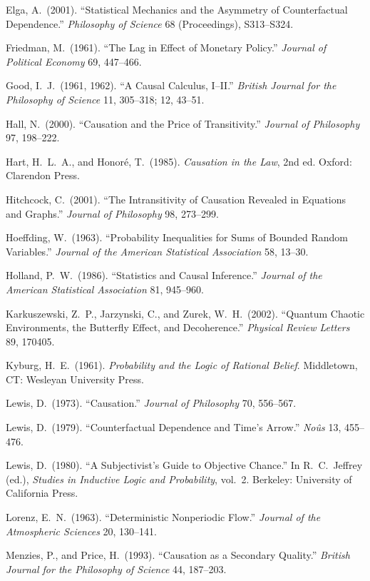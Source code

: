 \documentclass[11pt]{article}
\theoremstyle{definition}
\newenvironment{refs}{%
  \begin{list}{}{%
    \setlength{\leftmargin}{1.6em}%
    \setlength{\itemindent}{-1.6em}%
    \setlength{\itemsep}{0.35em}%
    \setlength{\parsep}{0pt}%
  }}
  {\end{list}}
\begin{document}
\begin{refs}
\item Elga, A.\ (2001). ``Statistical Mechanics and the Asymmetry of Counterfactual Dependence.'' \emph{Philosophy of Science} 68 (Proceedings), S313--S324.
\item Friedman, M.\ (1961). ``The Lag in Effect of Monetary Policy.'' \emph{Journal of Political Economy} 69, 447--466.
\item Good, I.\ J.\ (1961, 1962). ``A Causal Calculus, I--II.'' \emph{British Journal for the Philosophy of Science} 11, 305--318; 12, 43--51.
\item Hall, N.\ (2000). ``Causation and the Price of Transitivity.'' \emph{Journal of Philosophy} 97, 198--222.
\item Hart, H.\ L.\ A., and Honor\'e, T.\ (1985). \emph{Causation in the Law}, 2nd ed. Oxford: Clarendon Press.
\item Hitchcock, C.\ (2001). ``The Intransitivity of Causation Revealed in Equations and Graphs.'' \emph{Journal of Philosophy} 98, 273--299.
\item Hoeffding, W.\ (1963). ``Probability Inequalities for Sums of Bounded Random Variables.'' \emph{Journal of the American Statistical Association} 58, 13--30.
\item Holland, P.\ W.\ (1986). ``Statistics and Causal Inference.'' \emph{Journal of the American Statistical Association} 81, 945--960.
\item Karkuszewski, Z.\ P., Jarzynski, C., and Zurek, W.\ H.\ (2002). ``Quantum Chaotic Environments, the Butterfly Effect, and Decoherence.'' \emph{Physical Review Letters} 89, 170405.
\item Kyburg, H.\ E.\ (1961). \emph{Probability and the Logic of Rational Belief}. Middletown, CT: Wesleyan University Press.
\item Lewis, D.\ (1973). ``Causation.'' \emph{Journal of Philosophy} 70, 556--567.
\item Lewis, D.\ (1979). ``Counterfactual Dependence and Time's Arrow.'' \emph{No\^us} 13, 455--476.
\item Lewis, D.\ (1980). ``A Subjectivist's Guide to Objective Chance.'' In R.\ C.\ Jeffrey (ed.), \emph{Studies in Inductive Logic and Probability}, vol.\ 2. Berkeley: University of California Press.
\item Lorenz, E.\ N.\ (1963). ``Deterministic Nonperiodic Flow.'' \emph{Journal of the Atmospheric Sciences} 20, 130--141.
\item Menzies, P., and Price, H.\ (1993). ``Causation as a Secondary Quality.'' \emph{British Journal for the Philosophy of Science} 44, 187--203.

\end{refs}
\end{document}
